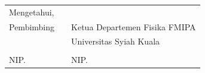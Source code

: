 \begin{singlespacing}
{\centering
\begin{tabular}{lll}
	Mengetahui, && \\
	[-0.1cm]
	Pembimbing &&Ketua Departemen Fisika FMIPA\\
	&&Universitas Syiah Kuala\\
	[1cm]
	\underline{\@firstsupervisor}&&\underline{\@kaprodi}\\
	NIP. \@firstnip&&NIP. \@kaprodinip
\end{tabular}
}

\end{singlespacing}

\makeatother